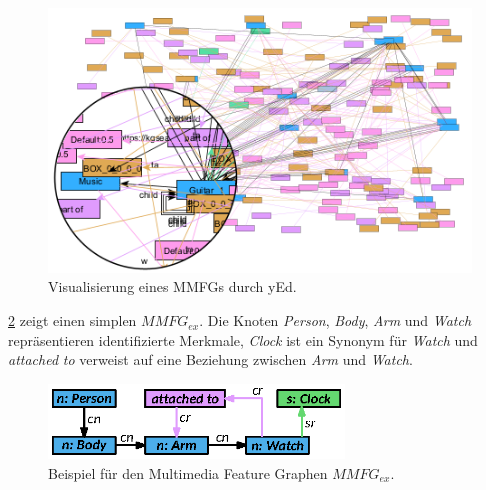 \begin{figure}[htb]
    \centering
    \includegraphics{resources/images/mmfg-example.png}
    \caption{Visualisierung eines MMFGs durch yEd.}
    \label{sec2:sota:subsec:fz-explainability:fig:mmfg-real-example}
\end{figure}

\cref{sec2:sota:subsec:fz-explainablity:fig:mmfg-example} zeigt einen simplen $MMFG_{ex}$.
Die Knoten \textit{Person}, \textit{Body}, \textit{Arm} und \textit{Watch} repräsentieren identifizierte Merkmale, \textit{Clock} ist ein Synonym für \textit{Watch} und \textit{attached} \textit{to} verweist auf eine Beziehung zwischen \textit{Arm} und \textit{Watch}.

\begin{figure}
    \centering
    \includegraphics[width=0.7\textwidth]{chapter/chapter_2/mmfg-ex.eps}
    \caption{Beispiel für den Multimedia Feature Graphen $MMFG_{ex}$.}
    \label{sec2:sota:subsec:fz-explainablity:fig:mmfg-example}
\end{figure}

